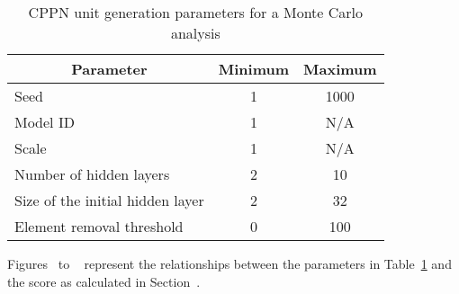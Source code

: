 \begin{table}[H]
\centering
\caption{CPPN unit generation parameters for a Monte Carlo analysis}
\label{tab:cppnmc}
\begin{tabular}{@{}lcc@{}}
\toprule
\multicolumn{1}{c}{\textbf{Parameter}} & \textbf{Minimum} & \textbf{Maximum} \\ \midrule
Seed                                   & 1                & 1000             \\
Model ID                               & 1                & N/A              \\
Scale                                  & 1                & N/A              \\
Number of hidden layers                & 2                & 10               \\
Size of the initial hidden layer       & 2                & 32               \\
Element removal threshold              & 0                & 100              \\ \bottomrule
\end{tabular}
\end{table}

Figures~ to ~ represent the relationships between the parameters in Table~\ref{tab:cppnmc} and the score as calculated in Section~.